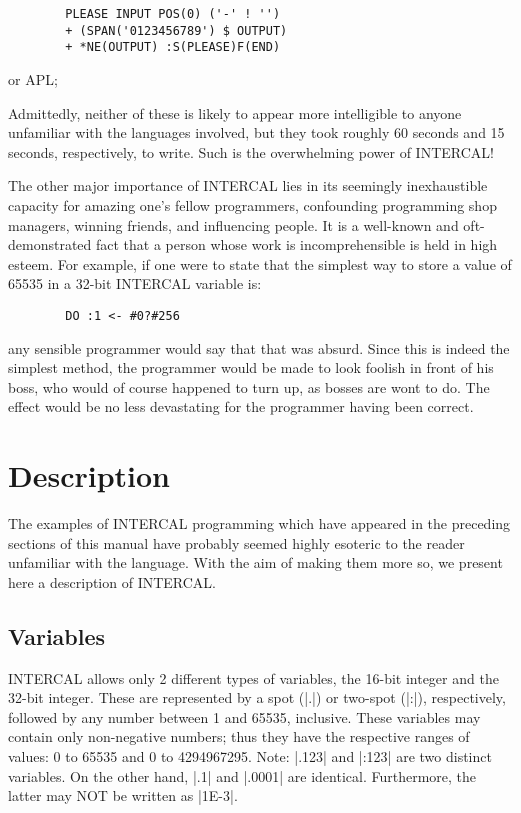 \begin{verbatim}
        PLEASE INPUT POS(0) ('-' ! '')
        + (SPAN('0123456789') $ OUTPUT)
        + *NE(OUTPUT) :S(PLEASE)F(END)
\end{verbatim}
\noindent or APL;


Admittedly, neither of these is likely to appear more intelligible to
anyone unfamiliar with the languages involved, but they took roughly 60
seconds and 15 seconds, respectively, to write.  Such is the overwhelming
power of INTERCAL!

The other major importance of INTERCAL lies in its seemingly inexhaustible
capacity for amazing one's fellow programmers, confounding programming shop
managers, winning friends, and influencing people.  It is a well-known and
oft-demonstrated fact that a person whose work is incomprehensible is held
in high esteem.  For example, if one were to state that the simplest way to
store a value of 65535 in a 32-bit INTERCAL variable is:

\begin{verbatim}
        DO :1 <- #0?#256
\end{verbatim}
any sensible programmer would say that that was absurd.  Since this is
indeed the simplest method, the programmer would be made to look foolish in
front of his boss, who would of course happened to turn up, as bosses are
wont to do.  The effect would be no less devastating for the programmer
having been correct.







\section{Description}

The examples of INTERCAL programming which have appeared in the preceding
sections of this manual have probably seemed highly esoteric to the reader
unfamiliar with the language.  With the aim of making them more so, we
present here a description of INTERCAL.


\subsection{Variables}

INTERCAL allows only 2 different types of variables, the 16-bit integer
and the 32-bit integer.  These are represented by a spot (|.|) or two-spot
(|:|), respectively, followed by any number between 1 and 65535, inclusive.
These variables may contain only non-negative numbers; thus they have the
respective ranges of values: 0 to 65535 and 0 to 4294967295.  Note: |.123|
and |:123| are two distinct variables.  On the other hand, |.1| and |.0001|
are identical.  Furthermore, the latter may NOT be written as |1E-3|.

